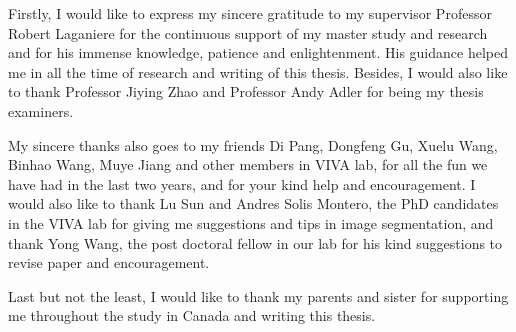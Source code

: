 \documentclass[
12pt, %
oneside, %
english, %
singlespacing, %
headsepline, %
]{MastersDoctoralThesis} %
\begin{document}
\begin{acknowledgements}
\addchaptertocentry{\acknowledgementname} %
Firstly, I would like to express my sincere gratitude to my supervisor Professor Robert Laganiere for the continuous support of my master study and research and for his immense knowledge, patience and enlightenment. His guidance helped me in all the time of research and writing of this thesis. Besides, I would also like to thank Professor Jiying Zhao and Professor Andy Adler for being my thesis examiners.

My sincere thanks also goes to my friends Di Pang, Dongfeng Gu, Xuelu Wang, Binhao Wang, Muye Jiang and other members in VIVA lab, for all the fun we have had in the last two years, and for your kind help and encouragement. I would also like to thank Lu Sun and Andres Solis Montero, the PhD candidates in the VIVA lab for giving me suggestions and tips in image segmentation, and thank Yong Wang, the post doctoral fellow in our lab for his kind suggestions to revise paper and encouragement. 

Last but not the least, I would like to thank my parents and sister for supporting me throughout the study in Canada and writing this thesis.
\end{acknowledgements}


\tableofcontents %

\listoffigures %

\listoftables %


%
%
\end{document}
